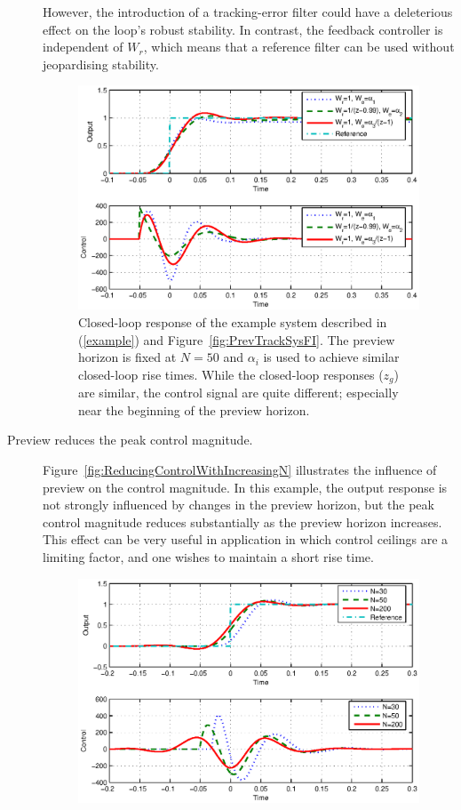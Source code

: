 \begin{description}
However, the introduction of a tracking-error filter could have a deleterious effect on the loop's robust stability. In contrast, the feedback controller is independent of $W_r$, which means that a reference filter can be used without jeopardising stability.  
\begin{figure}
\begin{center}
\includegraphics[width=\columnwidth]{./diags/CompWzWrNormForSimilarResp.eps}
\end{center}	
\caption{Closed-loop response of the example system described in (\ref{example}) and Figure~\ref{fig:PrevTrackSysFI}. The preview horizon is fixed at $N=50$ and $\alpha_i$ is used to achieve similar closed-loop rise times. While the closed-loop responses ($z_g$) are similar, the control signal are quite different; especially near the beginning of the preview horizon. \label{fig:CompWzWrNormForSimilarResp}}
\end{figure}
\item[Preview reduces the peak control magnitude.] 
Figure~\ref{fig:ReducingControlWithIncreasingN} illustrates the influence of preview on the control magnitude. In this example, the output response is not strongly influenced by changes in the preview horizon, but the peak control magnitude reduces substantially as the preview horizon increases. This effect can be very useful in application in which control ceilings are a limiting factor, and one wishes to maintain a short rise time.
\begin{figure}
\includegraphics[width=\columnwidth]{./diags/ReducingControlWithIncreasingN.eps}

\end{figure}
\end{description}
